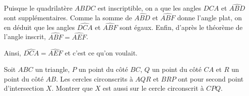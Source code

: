 \begin{sol}
Puisque le quadrilatère $ABDC$ est inscriptible, on a que les angles $\widehat{DCA}$ et $\widehat{ABD}$ sont supplémentaires. Comme la somme de $\widehat{ABD}$ et $\widehat{ABF}$ donne l'angle plat, on en déduit que les angles $\widehat{DCA}$ et $\widehat{ABF}$ sont égaux. Enfin, d'après le théorème de l'angle inscrit, $\widehat{ABF}=\widehat{AEF}$.

Ainsi, $\widehat{DCA}=\widehat{AEF}$ et c'est ce qu'on voulait.
\end{sol}

\begin{exo}
Soit $ABC$ un triangle, $P$ un point du côté $BC$, $Q$ un point
du côté $CA$ et $R$ un point du côté $AB$. Les cercles circonscrits
à $AQR$ et $BRP$ ont pour second point d'intersection $X$. Montrer
que $X$ est aussi sur le cercle circonscrit à $CPQ$.
\end{exo}

